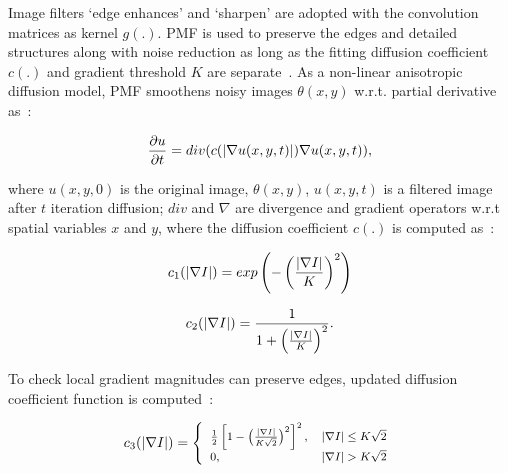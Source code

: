 \documentclass[conference]{IEEEtran}
\begin{document}
\vspace{2mm}
Image filters `edge enhances' and `sharpen' are adopted with the convolution matrices as kernel $g(.)$. PMF is used to preserve the edges and detailed structures along with noise reduction as long as the fitting diffusion coefficient $c(.)$ and gradient threshold $K$ are separate~\cite{95}. As a non-linear anisotropic diffusion model, PMF smoothens noisy images $\theta (x,y)$ w.r.t. partial derivative as~\cite{95}:

\vspace{-2mm}
\begin{equation}
\scriptsize{
    \frac{\partial u}{\partial t}= div(c(|\nabla u(x,y,t)|)\nabla u(x,y,t)),}
\end{equation}
\vspace{-2mm}

\noindent  where $u(x,y,0)$ is the original image, $\theta (x,y)$, $u(x,y,t)$ is a filtered image after $t$ iteration diffusion; $div$ and $\nabla$ are divergence and gradient operators w.r.t spatial variables $x$ and $y$, where the diffusion coefficient $c(.)$ is computed as~\cite{96}:

\vspace{-2mm}
\begin{equation}
\scriptsize{
    c_{1}(|\nabla I|)=exp \left(- \left(\frac{|\nabla I|}{K} \right)^{2} \right)} 
\end{equation}

\vspace{-4mm}
\begin{equation}
\scriptsize{
    c_{2}(|\nabla I|)=\frac{1}{1+\left(\frac{|\nabla I|}{K} \right)^{2}}. }
\end{equation}

To check local gradient magnitudes can preserve edges, updated diffusion coefficient function is computed~\cite{96}: 

\begin{equation}
\scriptsize{
    c_{3}(|\nabla I|)=\left\{
    \begin{array}{lr}
    \frac{1}{2}\left[1-\left(\frac{|\nabla I|}{K\sqrt{2}}\right)^{2}\right]^{2}, &|\nabla I|\leq K\sqrt{2}\\
    0,& |\nabla I|> K\sqrt{2}
    \end{array}
    \right.}
    \label{eq3.9}
\end{equation}
\end{document}
